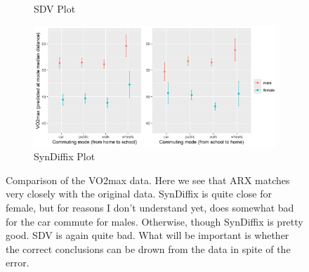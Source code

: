 \begin{figure}[htbp]
\begin{subfigure}[b]{0.48\textwidth}
            \caption{SDV Plot}
            \label{fig:r_sdv_plot}
        \end{subfigure}
        \hspace{0.0\textwidth}
        \begin{subfigure}[b]{0.48\textwidth}
            \centering
            \includegraphics[width=\textwidth]{figs/r_sdx_plot.png}
            \caption{SynDiffix Plot}
            \label{fig:r_sdx_plot}
        \end{subfigure}

        \caption{Comparison of the VO2max data. Here we see that ARX matches very closely with the original data. SynDiffix is quite close for female, but for reasons I don't understand yet, does somewhat bad for the car commute for males. Otherwise, though SynDiffix is pretty good. SDV is again quite bad. What will be important is whether the correct conclusions can be drown from the data in spite of the error.
        }
        \label{fig:comparison_plots}
    \end{figure}

    